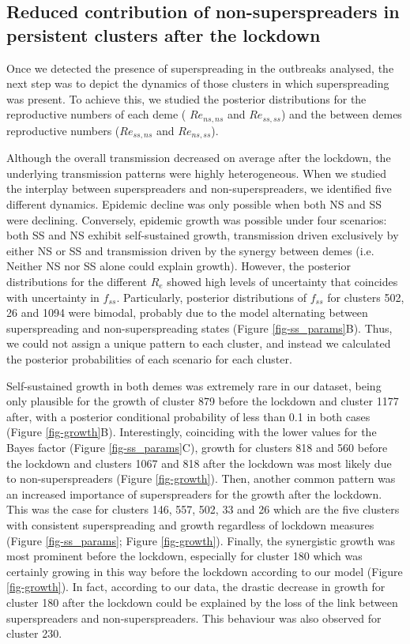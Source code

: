\documentclass[lineno,pdflatex,sn-nature]{sn-jnl}%
\theoremstyle{thmstyleone}%
\theoremstyle{thmstyletwo}%
\theoremstyle{thmstylethree}%
\begin{document}
\subsection{Reduced contribution of non-superspreaders in persistent clusters after the lockdown}

Once we detected the presence of superspreading in the outbreaks analysed, the next step was to depict the dynamics of those clusters in which superspreading was present. To achieve this, we studied the posterior distributions for the reproductive numbers of each deme ( $Re_{ns,ns}$ and $Re_{ss,ss}$) and the between demes reproductive numbers ($Re_{ss,ns}$ and $Re_{ns,ss}$). \newline

Although the overall transmission decreased on average after the lockdown, the underlying transmission patterns were highly heterogeneous. When we studied the interplay between superspreaders and non-superspreaders, we identified five different dynamics. Epidemic decline was only possible when both NS and SS were declining. Conversely, epidemic growth was possible under four scenarios: both SS and NS exhibit self-sustained growth, transmission driven exclusively by either NS or SS and transmission driven by the synergy between demes (i.e. Neither NS nor SS alone could explain growth). However, the posterior distributions for the different $R_e$ showed high levels of uncertainty that coincides with uncertainty in $f_{ss}$.  Particularly, posterior distributions of $f_{ss}$ for clusters 502, 26 and 1094 were bimodal, probably due to the model alternating between superspreading and non-superspreading states (Figure \ref{fig-ss_params}B). Thus, we could not assign a unique pattern to each cluster, and instead we calculated the posterior probabilities of each scenario for each cluster. \newline 

Self-sustained growth in both demes was extremely rare in our dataset, being only plausible for the growth of cluster 879 before the lockdown and cluster 1177 after, with a posterior conditional probability of less than 0.1 in both cases (Figure \ref{fig-growth}B). Interestingly, coinciding with the lower values for the Bayes factor (Figure \ref{fig-ss_params}C), growth for clusters 818 and 560 before the lockdown and clusters 1067 and 818 after the lockdown was most likely due to non-superspreaders (Figure \ref{fig-growth}). Then, another common pattern was an increased importance of superspreaders for the growth after the lockdown. This was the case for clusters 146, 557, 502, 33 and 26 which are the five clusters with consistent superspreading and growth regardless of lockdown measures (Figure \ref{fig-ss_params}; Figure \ref{fig-growth}).  Finally, the synergistic growth was most prominent before the lockdown, especially for cluster 180 which was certainly growing in this way before the lockdown according to our model (Figure \ref{fig-growth}). In fact, according to our data, the drastic decrease in growth for cluster 180 after the lockdown could be explained by the loss of the link between superspreaders and non-superspreaders. This behaviour was also observed for cluster 230. 
\end{document}
